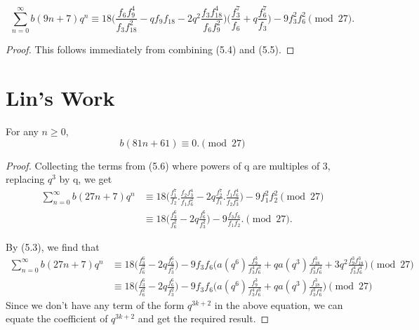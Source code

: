 \begin{lemma}
\begin{equation}
    \sum_{n=0}^\infty b(9n + 7)q^n \equiv 18\bigg( \frac{f_6f^4_9}{f_3f^2_{18}} - qf_9f_{18} - 2q^2\frac{f_3f^4_{18}}{f_6f^2_9}\bigg)\bigg( \frac{f^7_3}{f_6} + q\frac{f^7_6}{f_3} \bigg) - 9f^2_3f^2_6 \pmod{27}.
\end{equation}
\end{lemma}
\begin{proof}
    This follows immediately from combining (5.4) and (5.5).
\end{proof}

\section{Lin's Work}
\begin{theorem}
For any $ n \geq 0$,
\begin{equation}
    b(81n + 61) \equiv 0. \pmod{27}
\end{equation}
\end{theorem}
\begin{proof}
    Collecting the terms from (5.6) where powers of q are multiples of 3, replacing $q^3$ by q, we get
\begin{equation}
\begin{split}
    \sum_{n=0}^\infty b(27n+7)q^n &\equiv 18\bigg(\frac{f_1^7}{f_2}.\frac{f_2f_3^4}{f_1f_6^2} - 2q\frac{f_2^7}{f_1}.\frac{f_1f_6^4}{f_2f_3^2}\bigg) - 9f_1^2f_2^2 \pmod{27}
    \\&\equiv 18\bigg(\frac{f_3^6}{f_6^2}-2q\frac{f_6^6}{f_3^2}\bigg) - 9\frac{f_3f_6}{f_1f_2}. \pmod{27}.
\end{split}
\end{equation}

By (5.3), we find that 
\begin{equation}
\begin{split}
    \sum_{n=0}^\infty b(27n+7)q^n &\equiv 18\bigg(\frac{f_3^6}{f_6^2}-2q\frac{f_6^6}{f_3^2}\bigg) - 9f_3f_6\bigg(a(q^6) \frac{f_9^3}{f_3^4f_6^3}+qa(q^3)\frac{f_{18}^3}{f_3^4f_6^4} + 3q^2\frac{f_9^3f_{18}^3}{f_3^4f_6^4}\bigg) \pmod{27}
    \\&\equiv 18\bigg(\frac{f_3^6}{f_6^2} - 2q\frac{f_6^6}{f_3^2}\bigg) - 9f_3f_6\bigg(a(q^6)\frac{f_9^3}{f_3^4f_6^3}+qa(q^3)\frac{f_{18}^3}{f_3^3f_6^4}\bigg) \pmod{27}
\end{split}
\end{equation}
Since we don't have any term of the form $q^{3k+2}$ in the above equation, we can equate the coefficient of $q^{3k+2}$ and get the required result.
    
\end{proof}